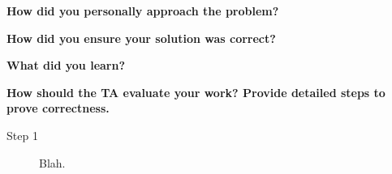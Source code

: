 \documentclass[10pt,letterpaper,draftclsnofoot,onecolumn]{IEEEtran}
\begin{document}
\noindent\textbf{How did you personally approach the problem?}


\noindent\textbf{How did you ensure your solution was correct?}

\indent{}

\noindent\textbf{What did you learn?}

\indent{}

\noindent\textbf{How should the TA evaluate your work? Provide detailed steps to prove correctness.}
\begin{description}
\item [Step 1] Blah.


\end{description}



\end{document}
